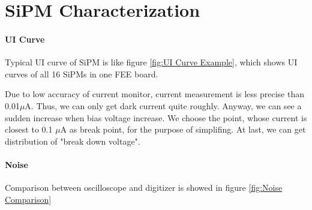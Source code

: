 \documentclass[11pt,a4paper]{article}
\begin{document}
\section{SiPM Characterization}
    \paragraph{UI Curve}
    
    Typical UI curve of SiPM is like figure \ref{fig:UI Curve Example}, which shows UI curves of all 16 SiPMs in one FEE board.
    
    Due to low accuracy of current monitor, current measurement is less precise than 0.01$\mu$A.
    Thus, we can only get dark current quite roughly. Anyway, we can see a sudden increase when bias voltage increase.
    We choose the point, whose current is closest to 0.1 $\mu$A as break point, for the purpose of simplifing.
    At last, we can get distribution of "break down voltage".
 

    \paragraph{Noise} Comparison between oscilloscope and digitizer is showed in figure \ref{fig:Noise Comparison}
\end{document}
